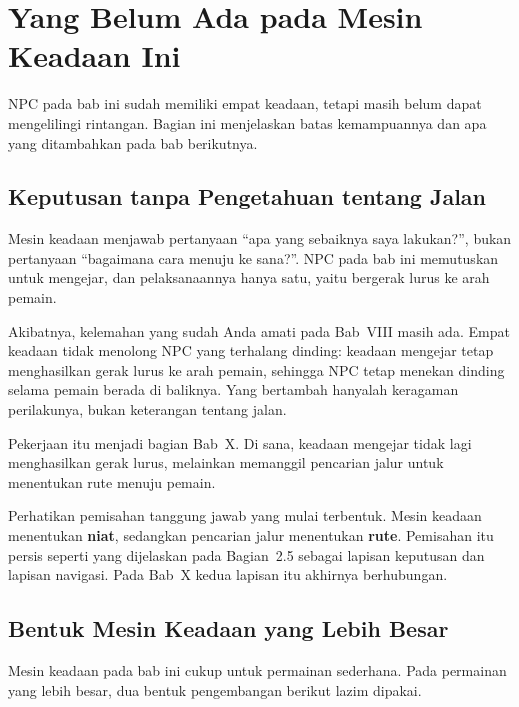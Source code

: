 \section{Yang Belum Ada pada Mesin Keadaan Ini}
\label{sec:belum-ada-fsm}

NPC pada bab ini sudah memiliki empat keadaan, tetapi masih belum dapat
mengelilingi rintangan. Bagian ini menjelaskan batas kemampuannya dan apa yang
ditambahkan pada bab berikutnya.

\subsection{Keputusan tanpa Pengetahuan tentang Jalan}

Mesin keadaan menjawab pertanyaan ``apa yang sebaiknya saya lakukan?'', bukan
pertanyaan ``bagaimana cara menuju ke sana?''. NPC pada bab ini memutuskan
untuk mengejar, dan pelaksanaannya hanya satu, yaitu bergerak lurus ke arah
pemain.

Akibatnya, kelemahan yang sudah Anda amati pada Bab~VIII masih ada. Empat
keadaan tidak menolong NPC yang terhalang dinding: keadaan mengejar tetap
menghasilkan gerak lurus ke arah pemain, sehingga NPC tetap menekan dinding
selama pemain berada di baliknya. Yang bertambah hanyalah keragaman perilakunya,
bukan keterangan tentang jalan.

Pekerjaan itu menjadi bagian Bab~X. Di sana, keadaan mengejar tidak lagi
menghasilkan gerak lurus, melainkan memanggil pencarian jalur untuk menentukan
rute menuju pemain.

\begin{catatabox}
Perhatikan pemisahan tanggung jawab yang mulai terbentuk. Mesin keadaan
menentukan \textbf{niat}, sedangkan pencarian jalur menentukan \textbf{rute}.
Pemisahan itu persis seperti yang dijelaskan pada Bagian~2.5 sebagai lapisan
keputusan dan lapisan navigasi. Pada Bab~X kedua lapisan itu akhirnya
berhubungan.
\end{catatabox}

\subsection{Bentuk Mesin Keadaan yang Lebih Besar}

Mesin keadaan pada bab ini cukup untuk permainan sederhana. Pada permainan yang
lebih besar, dua bentuk pengembangan berikut lazim dipakai.

